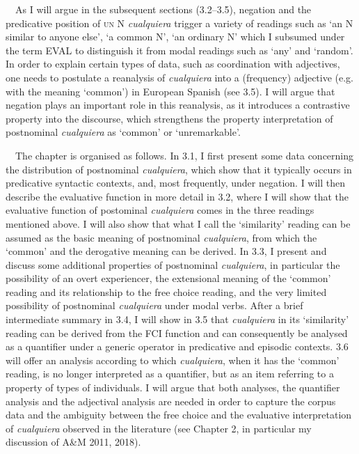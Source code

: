 \documentclass[10pt]{article}
\newenvironment{styleStandard}{\renewcommand\baselinestretch{1.25}\setlength\leftskip{0cm}\setlength\rightskip{0cm}\setlength\parindent{0cm}\setlength\parfillskip{0pt plus 1fil}\setlength\parskip{0in plus 1pt}\writerlistparindent\writerlistleftskip\leavevmode\normalfont\normalsize\fontsize{12pt}{14.4pt}\selectfont\writerlistlabel\ignorespaces}{\unskip\vspace{0in plus 1pt}\par}
\newcommand\writerlistleftskip{}
\newcommand\writerlistparindent{}
\newcommand\writerlistlabel{}
\begin{document}
\begin{styleStandard}
\ \ As I will argue in the subsequent sections (3.2–3.5), negation and the predicative position of \textsc{un} N \textit{cualquiera} trigger a variety of readings such as ‘an N similar to anyone else’, ‘a common N’, ‘an ordinary N’ which I subsumed under the term EVAL to distinguish it from modal readings such as ‘any’ and ‘random’. In order to explain certain types of data, such as coordination with adjectives, one needs to postulate a reanalysis of \textit{cualquiera} into a (frequency) adjective (e.g. with the meaning ‘common’) in European Spanish (see 3.5). I will argue that negation plays an important role in this reanalysis, as it introduces a contrastive property into the discourse, which strengthens the property interpretation of postnominal \textit{cualquiera} as ‘common’ or ‘unremarkable’.
\end{styleStandard}

\begin{styleStandard}
\ \ The chapter is organised as follows. In 3.1, I first present some data concerning the distribution of postnominal \textit{cualquiera}, which show that it typically occurs in predicative syntactic contexts, and, most frequently, under negation. I will then describe the evaluative function in more detail in 3.2, where I will show that the evaluative function of postominal \textit{cualquiera} comes in the three readings mentioned above. I will also show that what I call the ‘similarity’ reading can be assumed as the basic meaning of postnominal \textit{cualquiera}, from which the ‘common’ and the derogative meaning can be derived. In 3.3, I present and discuss some additional properties of postnominal \textit{cualquiera}, in particular the possibility of an overt experiencer, the extensional meaning of the ‘common’ reading and its relationship to the free choice reading, and the very limited possibility of postnominal \textit{cualquiera} under modal verbs. After a brief intermediate summary in 3.4, I will show in 3.5 that \textit{cualquiera} in its ‘similarity’ reading can be derived from the FCI function and can consequently be analysed as a quantifier under a generic operator in predicative and episodic contexts. 3.6 will offer an analysis according to which \textit{cualquiera}, when it has the ‘common’ reading, is no longer interpreted as a quantifier, but as an item referring to a property of types of individuals. I will argue that both analyses, the quantifier analysis and the adjectival analysis are needed in order to capture the corpus data and the ambiguity between the free choice and the evaluative interpretation of \textit{cualquiera} observed in the literature (see Chapter 2, in particular my discussion of A\&M 2011, 2018).
\end{styleStandard}
\end{document}
